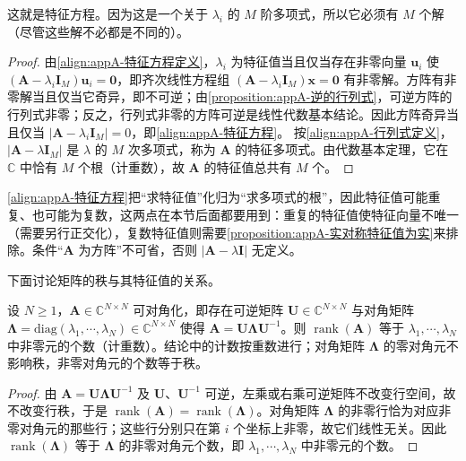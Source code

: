 \documentclass[../main.tex]{subfiles}
\begin{document}
这就是特征方程。因为这是一个关于 $\lambda_i$ 的 $M$ 阶多项式，所以它必须有 $M$ 个解（尽管这些解不必都是不同的）。

\begin{proof}
由\eqref{align:appA-特征方程定义}，$\lambda_i$ 为特征值当且仅当存在非零向量 $\bm{u}_i$ 使 $(\bm{A}-\lambda_i\bm{I}_{M})\bm{u}_i=\bm{0}$，即齐次线性方程组 $(\bm{A}-\lambda_i\bm{I}_{M})\bm{x}=\bm{0}$ 有非零解。方阵有非零解当且仅当它奇异，即不可逆；由\cref{proposition:appA-逆的行列式}，可逆方阵的行列式非零；反之，行列式非零的方阵可逆是线性代数基本结论。因此方阵奇异当且仅当 $|\bm{A}-\lambda_i\bm{I}_{M}|=0$，即\eqref{align:appA-特征方程}。
按\eqref{align:appA-行列式定义}，$|\bm{A}-\lambda\bm{I}_{M}|$ 是 $\lambda$ 的 $M$ 次多项式，称为 $\bm{A}$ 的特征多项式。由代数基本定理，它在 $\mathbb{C}$ 中恰有 $M$ 个根（计重数），故 $\bm{A}$ 的特征值总共有 $M$ 个。
\end{proof}

\begin{remark}
\eqref{align:appA-特征方程}把“求特征值”化归为“求多项式的根”，因此特征值可能重复、也可能为复数，这两点在本节后面都要用到：重复的特征值使特征向量不唯一（需要另行正交化），复数特征值则需要\cref{proposition:appA-实对称特征值为实}来排除。条件“$\bm{A}$ 为方阵”不可省，否则 $|\bm{A}-\lambda\bm{I}|$ 无定义。
\end{remark}

下面讨论矩阵的秩与其特征值的关系。

\begin{proposition}[秩与非零特征值的个数]\label{proposition:appA-秩与非零特征值}
设 $N\geqslant1$，$\bm{A}\in\mathbb{C}^{N\times N}$ 可对角化，即存在可逆矩阵 $\bm{U}\in\mathbb{C}^{N\times N}$ 与对角矩阵 $\bm{\Lambda}=\mathrm{diag}(\lambda_1,\cdots,\lambda_N)\in\mathbb{C}^{N\times N}$ 使得 $\bm{A}=\bm{U}\bm{\Lambda}\bm{U}^{-1}$。则 $\operatorname{rank}(\bm{A})$ 等于 $\lambda_1,\cdots,\lambda_N$ 中非零元的个数（计重数）。结论中的计数按重数进行；对角矩阵 $\bm{\Lambda}$ 的零对角元不影响秩，非零对角元的个数等于秩。
\end{proposition}

\begin{proof}
由 $\bm{A}=\bm{U}\bm{\Lambda}\bm{U}^{-1}$ 及 $\bm{U}$、$\bm{U}^{-1}$ 可逆，左乘或右乘可逆矩阵不改变行空间，故不改变行秩，于是 $\operatorname{rank}(\bm{A})=\operatorname{rank}(\bm{\Lambda})$。对角矩阵 $\bm{\Lambda}$ 的非零行恰为对应非零对角元的那些行；这些行分别只在第 $i$ 个坐标上非零，故它们线性无关。因此 $\operatorname{rank}(\bm{\Lambda})$ 等于 $\bm{\Lambda}$ 的非零对角元个数，即 $\lambda_1,\cdots,\lambda_N$ 中非零元的个数。
\end{proof}
\end{document}
